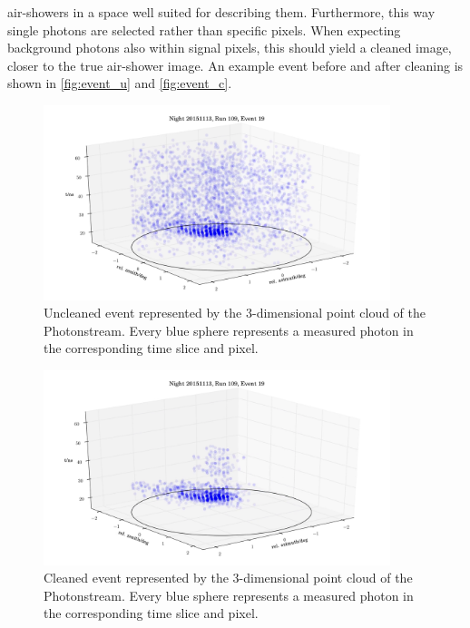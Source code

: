 air-showers in a space well suited for describing them. Furthermore, this way
single photons are selected rather than specific pixels. When expecting
background photons also within signal pixels, this should yield a cleaned image,
closer to the true air-shower image. An example event before and after cleaning
is shown in \autoref{fig:event_u} and \autoref{fig:event_c}.
%
%
%
\begin{figure}
  \centering
  \includegraphics[width=0.9\textwidth]{Plots/event2.png}
  \caption{Uncleaned event represented by the 3-dimensional point cloud of the Photonstream. Every blue sphere represents a measured photon in the corresponding time slice and pixel.}
  \label{fig:event_u}
\end{figure}
\begin{figure}
  \centering
  \includegraphics[width=0.9\textwidth]{Plots/event1.png}
  \caption{Cleaned event represented by the 3-dimensional point cloud of the Photonstream. Every blue sphere represents a measured photon in the corresponding time slice and pixel.}
  \label{fig:event_c}
\end{figure}
%


